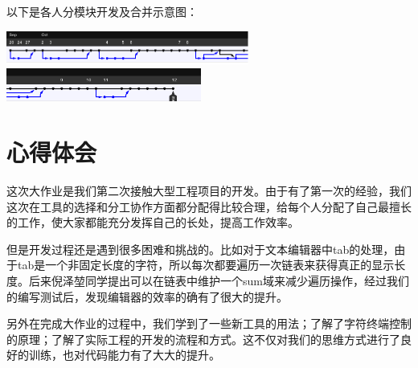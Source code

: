 \documentclass[a4paper,9pt]{article}
\begin{document}
以下是各人分模块开发及合并示意图：
\vspace{1.5em}
\begin{center}
	\includegraphics[height=1.1cm]{branch1.png}
	\includegraphics[height=1.1cm]{branch2.png}
\end{center}

\vspace{2em}
\section{心得体会}
这次大作业是我们第二次接触大型工程项目的开发。由于有了第一次的经验，我们这次在工具的选择和分工协作方面都分配得比较合理，给每个人分配了自己最擅长的工作，使大家都能充分发挥自己的长处，提高工作效率。

但是开发过程还是遇到很多困难和挑战的。比如对于文本编辑器中tab的处理，由于tab是一个非固定长度的字符，所以每次都要遍历一次链表来获得真正的显示长度。后来倪泽堃同学提出可以在链表中维护一个sum域来减少遍历操作，经过我们的编写测试后，发现编辑器的效率的确有了很大的提升。

另外在完成大作业的过程中，我们学到了一些新工具的用法；了解了字符终端控制的原理；了解了实际工程的开发的流程和方式。这不仅对我们的思维方式进行了良好的训练，也对代码能力有了大大的提升。
\end{document}
